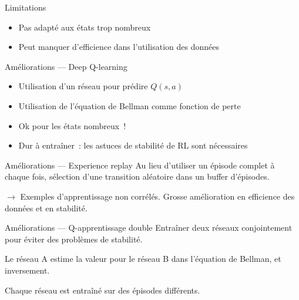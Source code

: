 \begin{frame}{Limitations}
  \begin{itemize}[<+->]
    \item Pas adapté aux états trop nombreux
    \item Peut manquer d'efficience dans l'utilisation des données
  \end{itemize}
\end{frame}

\begin{frame}{Améliorations --- Deep Q-learning}
  \begin{itemize}[<+->]
    \item Utilisation d'un réseau pour prédire $Q(s, a)$
    \item Utilisation de l'équation de Bellman comme fonction de perte
    \item Ok pour les états nombreux~!
    \item Dur à entraîner~: les astuces de stabilité de RL sont nécessaires
  \end{itemize}
\end{frame}

\begin{frame}{Améliorations --- Experience replay}
  Au lieu d'utiliser un épisode complet à chaque fois, sélection d'une transition aléatoire dans un buffer d'épisodes.

  $\rightarrow$ Exemples d'apprentissage non corrélés. Grosse amélioration en efficience des données et en stabilité.
\end{frame}

\begin{frame}{Améliorations --- Q-apprentissage double}
  Entraîner deux réseaux conjointement pour éviter des problèmes de stabilité.

  Le réseau A estime la valeur pour le réseau B dans l'équation de Bellman, et inversement.

  Chaque réseau est entraîné sur des épisodes différents.
\end{frame}
